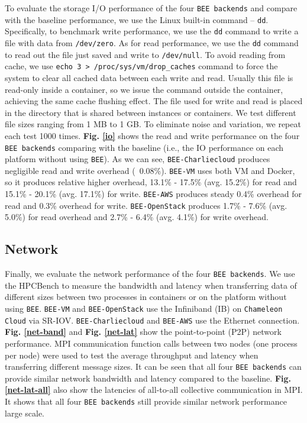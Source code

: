 To evaluate the storage I/O performance of the four \texttt{BEE backends} and compare with the baseline performance, we use the Linux built-in command -- \texttt{dd}. Specifically, to benchmark write performance, we use the \texttt{dd} command to write a file with data from \texttt{/dev/zero}. As for read performance, we use the \texttt{dd} command to read out the file just saved and write to \texttt{/dev/null}. To avoid reading from cache, we use \texttt{echo 3 > /proc/sys/vm/drop\_caches} command to force the system to clear all cached data between each write and read. Usually this file is read-only inside a container, so we issue the command outside the container, achieving the same cache flushing effect. The file used for write and read is placed in the directory that is shared between instances or containers. We test different file sizes ranging from 1 MB to 1 GB. To eliminate noise and variation, we repeat each test 1000 times. \textbf{Fig. \ref{io}} shows the read and write performance on the four \texttt{BEE backends} comparing with the baseline (i.e., the IO performance on each platform without using \texttt{BEE}). As we can see, \texttt{BEE-Charliecloud} produces negligible read and write overhead (~0.08\%). \texttt{BEE-VM} uses both VM and Docker, so it produces relative higher overhead, 13.1\% - 17.5\% (avg. 15.2\%) for read and 15.1\% - 20.1\% (avg. 17.1\%) for write. \texttt{BEE-AWS} produces steady 0.4\% overhead for read and 0.3\% overhead for write. \texttt{BEE-OpenStack} produces 1.7\% - 7.6\% (avg. 5.0\%) for read overhead and 2.7\% - 6.4\% (avg. 4.1\%) for write overhead.

\subsection{Network}
Finally, we evaluate the network performance of the four \texttt{BEE backends}. We use the HPCBench \cite{hpcbench} to measure the bandwidth and latency when transferring data of different sizes between two processes in containers or on the platform without using \texttt{BEE}. \texttt{BEE-VM} and \texttt{BEE-OpenStack} use the Infiniband (IB) on \texttt{Chameleon Cloud} via SR-IOV. \texttt{BEE-Charliecloud} and \texttt{BEE-AWS} use the Ethernet connection. \textbf{Fig. \ref{net-band}} and \textbf{Fig. \ref{net-lat}} show the point-to-point (P2P) network performance. MPI communication function calls between two nodes (one process per node) were used to test the average throughput and latency when transferring different message sizes. It can be seen that all four \texttt{BEE backends} can provide similar network bandwidth and latency compared to the baseline. \textbf{Fig. \ref{net-lat-all}} also show the latencies of all-to-all collective communication in MPI. It shows that all four \texttt{BEE backends} still provide similar network performance large scale. 

